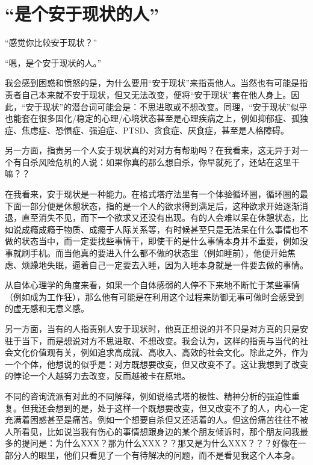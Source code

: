 \chapter{“是个安于现状的人”}






“感觉你比较安于现状？”

“嗯，是个安于现状的人。”

我会感到困惑和愤怒的是，为什么要用“安于现状”来指责他人。当然也有可能是指责者自己本来就不安于现状，但又无法改变，便将“安于现状”套在他人身上。因此，“安于现状”的潜台词可能会是：不思进取或不想改变。同理，“安于现状”似乎也能套在很多固化/稳定的心理/心境状态甚至是心理疾病之上，例如抑郁症、孤独症、焦虑症、恐惧症、强迫症、PTSD、贪食症、厌食症，甚至是人格障碍。

另一方面，指责另一个人安于现状真的对对方有帮助吗？在我看来，这无异于对一个有自杀风险危机的人说：如果你真的那么想自杀，你早就死了，还站在这里干嘛？？

在我看来，安于现状是一种能力。在格式塔疗法里有一个体验循环圈，循环圈的最下面一部分便是休憩状态，指的是一个人的欲求得到满足后，这种欲求开始逐渐消退，直至消失不见，而下一个欲求又还没有出现。有的人会难以呆在休憩状态，比如说成瘾\pozhehao{}成瘾于物质、成瘾于人际关系等，有时候甚至只是无法呆在什么事情也不做的状态当中，而一定要找些事情干，即使干的是什么事情本身并不重要，例如没事就刷手机。而当他真的要进入什么都不做的状态里（例如睡前），他便开始焦虑、烦躁地失眠，逼着自己一定要去入睡，因为入睡本身就是一件要去做的事情。

从自体心理学的角度来看，如果一个自体感弱的人停不下来地不断忙于某些事情（例如成为工作狂），那么他有可能是在利用这个过程来防御无事可做时会感受到的虚无感和无意义感。

另一方面，当有的人指责别人安于现状时，他真正想说的并不只是对方真的只是安驻于当下，而是想说对方不思进取、不想改变。我会认为，这样的指责与当代的社会文化价值观有关，例如追求高成就、高收入、高效的社会文化。除此之外，作为一个个体，他想说的似乎是：对方既想要改变，但又改变不了。这让我想到了改变的悖论\pozhehao{}一个人越努力去改变，反而越被卡在原地。

不同的咨询流派有对此的不同解释，例如说格式塔的极性、精神分析的强迫性重复。但我还会想到的是，处于这样一个既想要改变，但又改变不了的人，内心一定充满着困惑甚至是痛苦。例如一个想要自杀但又还活着的人。但这份痛苦往往不被人所看见，比如说当我有伤心的事情想跟身边的某个朋友倾诉时，那个朋友问我最多的提问是：为什么XXX？那为什么XXX？？那又是为什么XXX？？？好像在一部分人的眼里，他们只看见了一个有待解决的问题，而不是看见我这个人本身。

